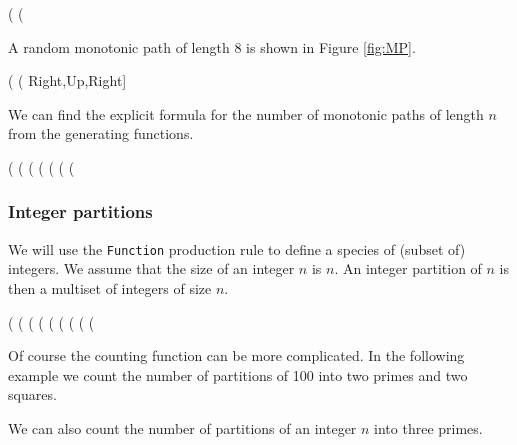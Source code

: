 \documentclass[11pt]{article}
\newcommand{\command}[1]{\texttt{#1}}
\begin{document}
\begin{example}
(%
(%
\end{example}
%
A random monotonic path of length 8 is shown in Figure \ref{fig:MP}.

\begin{example}
(%
(%
       Right,Up,Right]
\end{example}
%
We can find the explicit formula for the number of monotonic paths of
length $n$ from the generating functions.

\begin{example}
(%
(%
(%
(%
(%
(%
(%
\end{example}

\subsubsection{Integer partitions}

We will use the \command{Function} production rule to define a species
of (subset of) integers. We assume that the size of an integer $n$ is
$n$.  An integer partition of $n$ is then a multiset of integers of
size $n$.

\begin{example}
(%
(%
(%
(%
(%
(%
(%
(%
(%
\end{example}
%
Of course the counting function can be more complicated. In the
following example we count the number of partitions of 100 into two
primes and two squares.

%
We can also count the number of partitions of an integer $n$ into
three primes.
\end{document}
